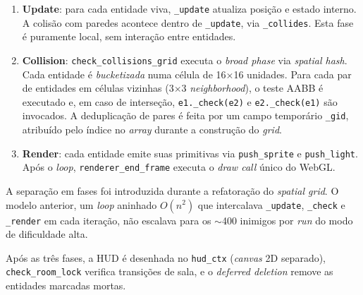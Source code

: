 \begin{enumerate}
  \item \textbf{Update}: para cada entidade viva, \texttt{\_update} atualiza posição e
    estado interno. A colisão com paredes acontece dentro de \texttt{\_update}, via
    \texttt{\_collides}. Esta fase é puramente local, sem interação entre entidades.

  \item \textbf{Collision}: \texttt{check\_collisions\_grid} executa o \emph{broad
    phase} via \emph{spatial hash}. Cada entidade é \emph{bucketizada} numa célula de
    16$\times$16 unidades. Para cada par de entidades em células vizinhas (3$\times$3
    \emph{neighborhood}), o teste AABB é executado e, em caso de interseção,
    \texttt{e1.\_check(e2)} e \texttt{e2.\_check(e1)} são invocados. A deduplicação de
    pares é feita por um campo temporário \texttt{\_gid}, atribuído pelo índice no
    \emph{array} durante a construção do \emph{grid}.

  \item \textbf{Render}: cada entidade emite suas primitivas via \texttt{push\_sprite}
    e \texttt{push\_light}. Após o \emph{loop}, \texttt{renderer\_end\_frame} executa
    o \emph{draw call} único do WebGL.
\end{enumerate}

A separação em fases foi introduzida durante a refatoração do \emph{spatial grid}. O
modelo anterior, um \emph{loop} aninhado $O(n^2)$ que intercalava \texttt{\_update},
\texttt{\_check} e \texttt{\_render} em cada iteração, não escalava para os
$\sim$400 inimigos por \emph{run} do modo de dificuldade alta.

Após as três fases, a HUD é desenhada no \texttt{hud\_ctx} (\emph{canvas} 2D
separado), \texttt{check\_room\_lock} verifica transições de sala, e o
\emph{deferred deletion} remove as entidades marcadas mortas.

